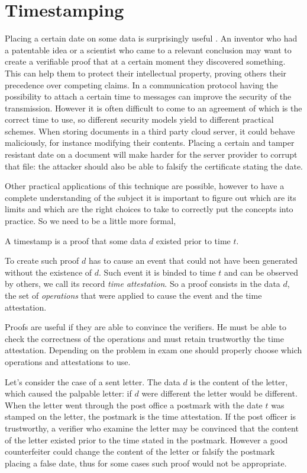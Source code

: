 \chapter{Timestamping}
\label{chpr:timestamping}
Placing a certain date on some data is surprisingly useful \cite{Haber91howto, Bayer93improvingthe, Massias99designof, OTSannouncment}.
An inventor who had a patentable idea or a scientist who came to a relevant conclusion may want to create a verifiable proof that at a certain moment they discovered something. This can help them to protect their intellectual property, proving others their precedence over competing claims.
In a communication protocol having the possibility to attach a certain time to messages can improve the security of the transmission. However it is often difficult to come to an agreement of which is the correct time to use, so different security models yield to different practical schemes.
When storing documents in a third party cloud server, it could behave maliciously, for instance modifying their contents. Placing a certain and tamper resistant date on a document will make harder for the server provider to corrupt that file: the attacker should also be able to falsify the certificate stating the date. 

Other practical applications of this technique are possible, however to have a complete understanding of the subject it is important to figure out which are its limits and which are the right choices to take to correctly put the concepts into practice. So we need to be a little more formal,
\begin{mydef}
	A timestamp is a proof that some data $d$ existed prior to time $t$.
\end{mydef}
To create such proof $d$ has to cause an event that could not have been generated without the existence of $d$. Such event it is binded to time $t$ and can be observed by others, we call its record \textit{time attestation}. So a proof consists in the data $d$, the set of \textit{operations} that were applied to cause the event and the time attestation.

Proofs are useful if they are able to convince the verifiers. He must be able to check the correctness of the operations and must retain trustworthy the time attestation. Depending on the problem in exam one should properly choose which operations and attestations to use. 

Let's consider the case of a sent letter. The data $d$ is the content of the letter, which caused the palpable letter: if $d$ were different the letter would be different. When the letter went through the post office a postmark with the date $t$ was stamped on the letter, the postmark is the time attestation. If the post officer is trustworthy, a verifier who examine the letter may be convinced that the content of the letter existed prior to the time stated in the postmark. However a good counterfeiter could change the content of the letter or falsify the postmark placing a false date, thus for some cases such proof would not be appropriate.

